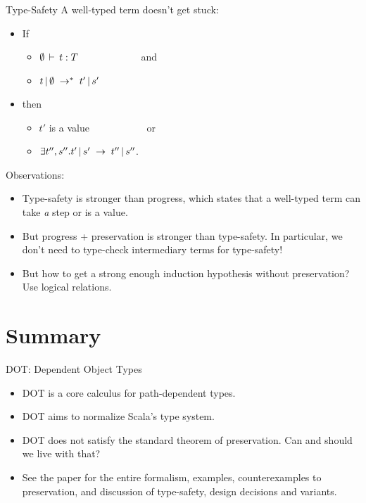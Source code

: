 \documentclass{beamer}
\begin{document}
\begin{frame}[fragile]{Type-Safety}
A well-typed term doesn't get stuck:
\begin{itemize}
\item If
\begin{itemize}
  \item $\emptyset \ts t \typ T$ \ \ \ \ \ \ \ \ \ \ \ \ and
  \item $\reductionl t \emptyset {t'} {s'} *$
\end{itemize}
\item then
\begin{itemize}
  \item $t'$ is a value \ \ \ \ \ \ \ \ \ \ \ or
  \item $\exists t'', s''. \reduction {t'} {s'} {t''} {s''}$.
\end{itemize}
\end{itemize}

Observations:
\begin{itemize}
\item Type-safety is stronger than progress, which states that a
  well-typed term can take \emph{a} step or is a value.
\item But progress + preservation is stronger than type-safety. In
  particular, we don't need to type-check intermediary terms for
  type-safety!
\item But how to get a strong enough induction hypothesis without
  preservation? Use logical relations.
\end{itemize}
\end{frame}

\section{Summary}

\begin{frame}[fragile]{DOT: Dependent Object Types}
\begin{itemize}
\item DOT is a core calculus for path-dependent types.
\item DOT aims to normalize Scala's type system.
\item DOT does not satisfy the standard theorem of preservation. Can and should we live with that?
\item See the paper for the entire formalism, examples,
  counterexamples to preservation, and discussion of type-safety,
  design decisions and variants.
\end{itemize}
\end{frame}
\end{document}
